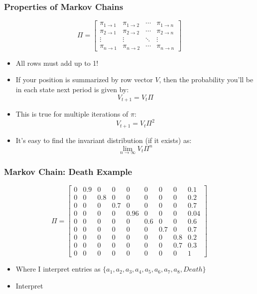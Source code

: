 \documentclass{beamer}
\begin{document}
\begin{frame}
\frametitle[alignment=center]{Properties of Markov Chains}
$$\Pi=\left[\begin{array}{cccc}\pi_{1\rightarrow1} & \pi_{1\rightarrow2} & \cdots & \pi_{1\rightarrow n} \\ 
\pi_{2\rightarrow1} & \pi_{2\rightarrow2} & \cdots & \pi_{2\rightarrow n} \\
\vdots & \vdots & \ddots & \vdots \\
\pi_{n\rightarrow1} & \pi_{n\rightarrow2} & \cdots & \pi_{n\rightarrow n} 
 \end{array}\right]$$
\begin{itemize}
\item All rows must add up to 1!
\item If your position is summarized by row vector $V$, then the probability you'll be in each state next period is given by:
$$V_{t+1}=V_t\Pi $$
\item This is true for multiple iterations of $\pi$:
$$V_{t+1}=V_t\Pi^2 $$
\item It's easy to find the invariant distribution (if it exists) as:
$$\underset{n\rightarrow \infty}{\lim}V_t\Pi^n$$
\end{itemize}
\end{frame}

\begin{frame}
\frametitle[alignment=center]{Markov Chain: Death Example}
$$\Pi=\left[\begin{array}{ccccccccc}
0 & 0.9 & 0 & 0 & 0 & 0 & 0 & 0 & 0.1 \\
0 & 0 & 0.8 & 0 & 0 & 0 & 0 & 0 & 0.2 \\
0 & 0 & 0 & 0.7 & 0 & 0 & 0 & 0 & 0.7 \\
0 & 0 & 0 & 0 & 0.96 & 0 & 0 & 0 & 0.04 \\
0 & 0 & 0 & 0 & 0 & 0.6 & 0 & 0 & 0.6 \\
0 & 0 & 0 & 0 & 0 & 0 & 0.7 & 0 & 0.7 \\
0 & 0 & 0 & 0 & 0 & 0 & 0 & 0.8 & 0.2 \\
0 & 0 & 0 & 0 & 0 & 0 & 0 & 0.7 & 0.3\\
0 & 0 & 0 & 0 & 0 & 0 & 0 & 0 & 1
\end{array}\right]$$
\begin{itemize}
\item Where I interpret entries as $\{a_1,a_2,a_3,a_4,a_5,a_6,a_7,a_8,Death\}$
\item Interpret 
\end{itemize}
\end{frame}
\end{document}
